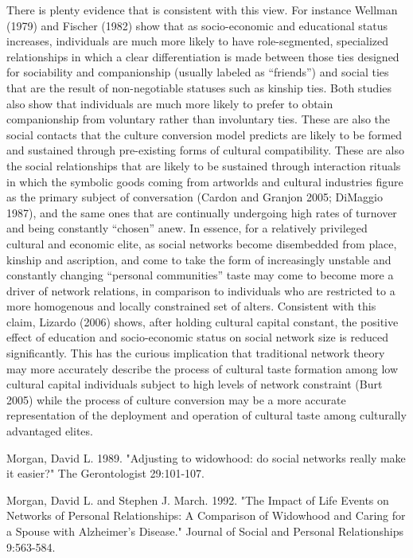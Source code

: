 There is plenty evidence that is consistent with this view. For instance Wellman (1979) and Fischer (1982) show that as socio-economic and educational status increases, individuals are much more likely to have role-segmented, specialized relationships in which a clear differentiation is made between those ties designed for sociability and companionship (usually labeled as “friends”) and social ties that are the result of non-negotiable statuses such as kinship ties. Both studies also show that individuals are much more likely to prefer to obtain companionship from voluntary rather than involuntary ties. These are also the social contacts that the culture conversion model predicts are likely to be formed and sustained through pre-existing forms of cultural compatibility. These are also the social relationships that are likely to be sustained through interaction rituals in which the symbolic goods coming from artworlds and cultural industries figure as the primary subject of conversation (Cardon and Granjon 2005; DiMaggio 1987), and the same ones that are continually undergoing high rates of turnover and being constantly “chosen” anew. In essence, for a relatively privileged cultural and economic elite, as social networks become disembedded from place, kinship and ascription, and come to take the form of increasingly unstable and constantly changing “personal communities” taste may come to become more a driver of network relations, in comparison to individuals who are restricted to a more homogenous and locally constrained set of alters. Consistent with this claim, Lizardo (2006) shows, after holding cultural capital constant, the positive effect of education and socio-economic status on social network size is reduced significantly. This has the curious implication that traditional network theory may more accurately describe the process of cultural taste formation among low cultural capital individuals subject to high levels of network constraint (Burt 2005) while the process of culture conversion may be a more accurate representation of the deployment and operation of cultural taste among culturally advantaged elites.

Morgan, David L. 1989. "Adjusting to widowhood: do social networks really make it easier?" The Gerontologist 29:101-107.

Morgan, David L. and Stephen J. March. 1992. "The Impact of Life Events on Networks of Personal Relationships: A Comparison of Widowhood and Caring for a Spouse with Alzheimer's Disease." Journal of Social and Personal Relationships 9:563-584.

